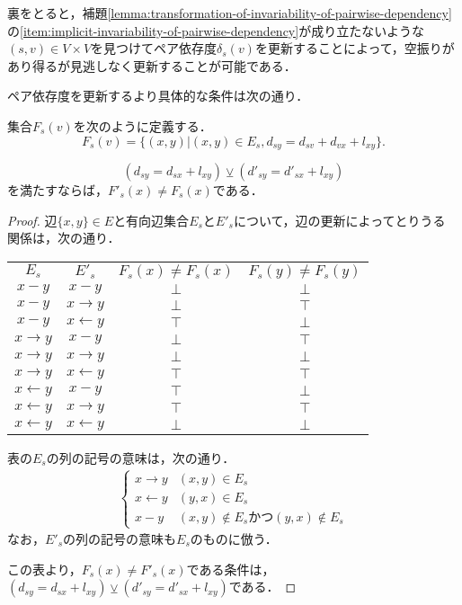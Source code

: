 裏をとると，補題\ref{lemma:transformation-of-invariability-of-pairwise-dependency}の\ref{item:implicit-invariability-of-pairwise-dependency}が成り立たないような$(s,v)\in V\times V$を見つけてペア依存度$\delta_s(v)$を更新することによって，空振りがあり得るが見逃しなく更新することが可能である．

ペア依存度を更新するより具体的な条件は次の通り．
\begin{lemma}
  \label{lemma:condition-of-update-pairwise-dependency}
  集合$F_s(v)$を次のように定義する．
  \[ F_s(v)=\{(x,y)|(x,y)\in E_s,d_{sy}=d_{sv}+d_{vx}+l_{xy}\}. \]

  \[ (d_{sy}=d_{sx}+l_{xy})\veebar(d'_{sy}=d'_{sx}+l_{xy}) \]
  を満たすならば，$F'_s(x)\neq F_s(x)$である．
\end{lemma}
\begin{proof}
  辺$\{x,y\}\in E$と有向辺集合$E_s$と$E'_s$について，辺の更新によってとりうる
  関係は，次の通り．

  \begin{center}
    \begin{tabular}{cccc}
      $E_s$ & $E'_s$ & $F_s(x)\neq F_s(x)$ & $F_s(y)\neq F_s(y)$ \\
      $x-y$ & $x-y$ & $\bot$ & $\bot$ \\
      $x-y$ & $x\rightarrow y$ & $\bot$ & $\top$ \\
      $x-y$ & $x\leftarrow y$ & $\top$ & $\bot$ \\
      $x\rightarrow y$ & $x-y$ & $\bot$ & $\top$ \\
      $x\rightarrow y$ & $x\rightarrow y$ & $\bot$ & $\bot$ \\
      $x\rightarrow y$ & $x\leftarrow y$ & $\top$ & $\top$ \\
      $x\leftarrow y$ & $x-y$ & $\top$ & $\bot$ \\
      $x\leftarrow y$ & $x\rightarrow y$ & $\top$ & $\top$ \\
      $x\leftarrow y$ & $x\leftarrow y$ & $\bot$ & $\bot$ \\
    \end{tabular}
  \end{center}

  表の$E_s$の列の記号の意味は，次の通り．
  \begin{align*}
    \begin{cases}
      x\rightarrow y & (x,y)\in E_s \\
      x\leftarrow y & (y,x)\in E_s \\
      x-y & (x,y)\notin E_s\text{かつ}(y,x)\notin E_s
    \end{cases}
  \end{align*}
  なお，$E'_s$の列の記号の意味も$E_s$のものに倣う．

  この表より，$F_s(x)\neq F'_s(x)$である条件は，$(d_{sy}=d_{sx}+l_{xy})\veebar(d'_{sy}=d'_{sx}+l_{xy})$である．
\end{proof}

